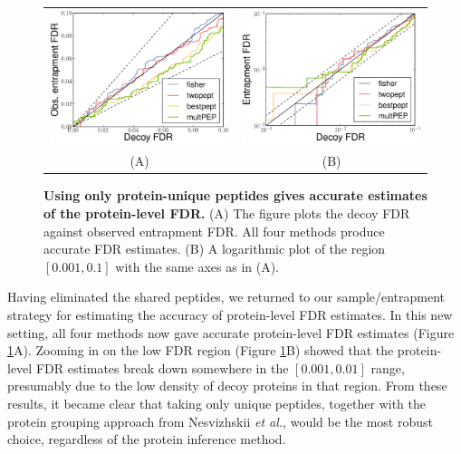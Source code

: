 \documentclass{article}
\begin{document}
\begin{figure}
\begin{center}
\begin{tabular}{cc} 
\includegraphics[width=0.45\linewidth]{./img/unique-pept-accuracy} &
\includegraphics[width=0.45\linewidth]{./img/unique-pept-accuracy-log}
\\
(A) & (B)
\end{tabular}
\caption{\label{fig:unique-accuracy}\textbf{Using only protein-unique
    peptides gives accurate estimates of the protein-level FDR.}
  (A) The figure plots the decoy FDR against observed entrapment FDR.
  All four methods produce accurate FDR estimates. (B) A logarithmic 
  plot of the region $[0.001, 0.1]$ with the same axes as in (A).}
\end{center}
\end{figure}

Having eliminated the shared peptides, we returned to our
sample/entrapment strategy for estimating the accuracy of
protein-level FDR estimates.  In this new setting, all four methods
now gave accurate protein-level FDR estimates (Figure
\ref{fig:unique-accuracy}A).  Zooming in on the low FDR region (Figure
\ref{fig:unique-accuracy}B) showed that the protein-level FDR
estimates break down somewhere in the $[0.001, 0.01]$ range,
presumably due to the low density of decoy proteins in that region.
From these results, it became clear that taking only unique peptides,
together with the protein grouping approach from Nesvizhskii {\em et
  al.}, would be the most robust choice, regardless of the protein
inference method.
\end{document}
